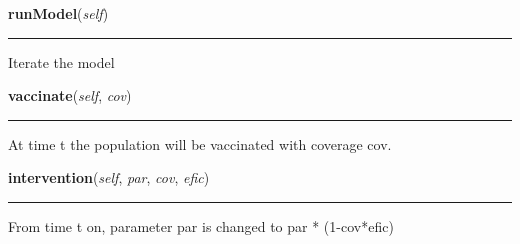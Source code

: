     \label{Epigrass:simobj:siteobj:runModel}

    \vspace{0.5ex}

    \begin{boxedminipage}{\textwidth}

    \raggedright \textbf{runModel}(\textit{self})

    \vspace{-1.5ex}

    \rule{\textwidth}{0.5\fboxrule}
    Iterate the model

    \vspace{1ex}

    \end{boxedminipage}

    \label{Epigrass:simobj:siteobj:vaccinate}

    \vspace{0.5ex}

    \begin{boxedminipage}{\textwidth}

    \raggedright \textbf{vaccinate}(\textit{self}, \textit{cov})

    \vspace{-1.5ex}

    \rule{\textwidth}{0.5\fboxrule}
    At time t the population will be vaccinated with coverage cov.

    \vspace{1ex}

    \end{boxedminipage}

    \label{Epigrass:simobj:siteobj:intervention}

    \vspace{0.5ex}

    \begin{boxedminipage}{\textwidth}

    \raggedright \textbf{intervention}(\textit{self}, \textit{par}, \textit{cov}, \textit{efic})

    \vspace{-1.5ex}

    \rule{\textwidth}{0.5\fboxrule}
    From time t on, parameter par is changed to par * (1-cov*efic)

    \vspace{1ex}

    \end{boxedminipage}


